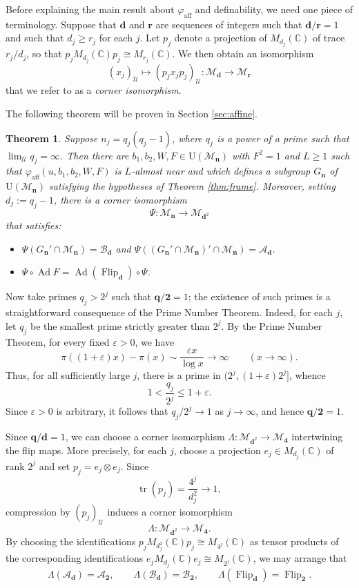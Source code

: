 \documentclass[12pt]{amsart}
\numberwithin{equation}{section}
\newtheorem{thm}{Theorem}[section]
\theoremstyle{definition}
\newcommand{\C}{\mathbb{C}}
\def\bb{\mathbb}
\def\cal{\mathcal}
\def\M{\mathcal{M}}
\DeclareMathOperator{\tr}{tr}
\newcommand\cU{{\cal U}}
\def \M{\mathcal{M}}
\def \A{\mathcal{A}}
\def \B{\mathcal{B}}
\def \two{\mathbf{2}}
\begin{document}
Before explaining the main result about $\varphi_{\operatorname{aff}}$ and definability, we need one piece of terminology.  Suppose that $\mathbf{d}$ and $\mathbf{r}$ are sequences of integers such that $\mathbf{d}/\mathbf{r}=1$ and such that $d_j\geq r_j$ for each $j$.  Let $p_j$ denote a projection of $M_{d_j}(\bb C)$ of trace $r_j/d_j$, so that $p_jM_{d_j}(\bb C)p_j\cong M_{r_j}(\bb C)$.  We then obtain an isomorphism $$(x_j)_\cU\mapsto (p_jx_jp_j)_\cU:\M_\mathbf{d}\to \M_{\mathbf{r}}$$ that we refer to as a \emph{corner isomorphism}. 

  The following theorem will be proven in Section \ref{sec:affine}.

\begin{thm}\label{thm:affine}
Suppose $n_j=q_j(q_j-1)$, where $q_j$ is a power of a prime such that
$\lim_{\cU}q_j=\infty$.  Then there are $b_1,b_2,W,F\in \mathrm{U}(\M_{\mathbf{n}})$ with $F^2=1$ and $L\geq 1$ such that $\varphi_{\operatorname{aff}}(u,b_1,b_2,W,F)$ is $L$-almost near and which defines a subgroup $G_{\mathbf{n}}$ of $\mathrm{U}(\M_{\mathbf{n}})$ satisfying the hypotheses of Theorem \ref{thm:frame}.  Moreover, setting $d_j:=q_j-1$, there is a corner isomorphism
$$\Psi:\M_{\mathbf{n}}\to \M_{\mathbf{d}^2}$$ that satisfies:
\begin{itemize}
    \item $\Psi(G_{\mathbf{n}}'\cap \M_{\mathbf{n}})=\B_{\mathbf{d}}$ and $\Psi((G_{\mathbf{n}}'\cap \M_{\mathbf{n}})'\cap \M_{\mathbf{n}})=\A_{\mathbf{d}}$.
    \item $\Psi\circ \operatorname{Ad} F=\operatorname{Ad}(\operatorname{Flip}_{\mathbf{d}})\circ \Psi$.
\end{itemize}
\end{thm}

Now take primes $q_j>2^j$ such that $\mathbf{q}/\two=1$; the existence of such primes is a straightforward consequence of the Prime Number Theorem.  Indeed, for each $j$, let $q_j$ be the smallest prime strictly
greater than $2^j$. By the Prime Number Theorem, for every
fixed $\varepsilon>0$, we have
\[
\pi((1+\varepsilon)x)-\pi(x)
\sim \frac{\varepsilon x}{\log x}
\longrightarrow\infty
\qquad (x\to\infty).
\]
Thus, for all sufficiently large $j$, there is a prime
in $(2^j,(1+\varepsilon)2^j]$, whence
\[
1<\frac{q_j}{2^j}\leq 1+\varepsilon.
\]
Since $\varepsilon>0$ is arbitrary, it follows that
$q_j/2^j\to 1$ as $j\to\infty$, and hence
$\mathbf q/\mathbf 2=1$.

Since $\mathbf{q}/\mathbf{d}=1$, we can choose a corner isomorphism $\Lambda:\M_{\mathbf{d}^2}\to \M_\mathbf{4}$ intertwining the flip maps. 
More precisely, for each $j$, choose a projection
$e_j\in M_{d_j}(\C)$ of rank $2^j$ and set
$p_j=e_j\otimes e_j$. Since
\[
\tr(p_j)=\frac{4^j}{d_j^2}\longrightarrow 1,
\]
compression by $(p_j)_\cU$ induces a corner
isomorphism
\[
\Lambda:\M_{\mathbf{d}^2}\longrightarrow
\M_{\mathbf{4}}.
\]
By choosing the identifications
$p_jM_{d_j^2}(\C)p_j\cong M_{4^j}(\C)$
as tensor products of the corresponding
identifications
$e_jM_{d_j}(\C)e_j\cong M_{2^j}(\C)$,
we may arrange that
\[
\Lambda(\A_{\mathbf d})=\A_{\mathbf 2},
\qquad
\Lambda(\B_{\mathbf d})=\B_{\mathbf 2},
\qquad
\Lambda(\operatorname{Flip}_{\mathbf d})
=\operatorname{Flip}_{\mathbf 2}.
\]
\end{document}
